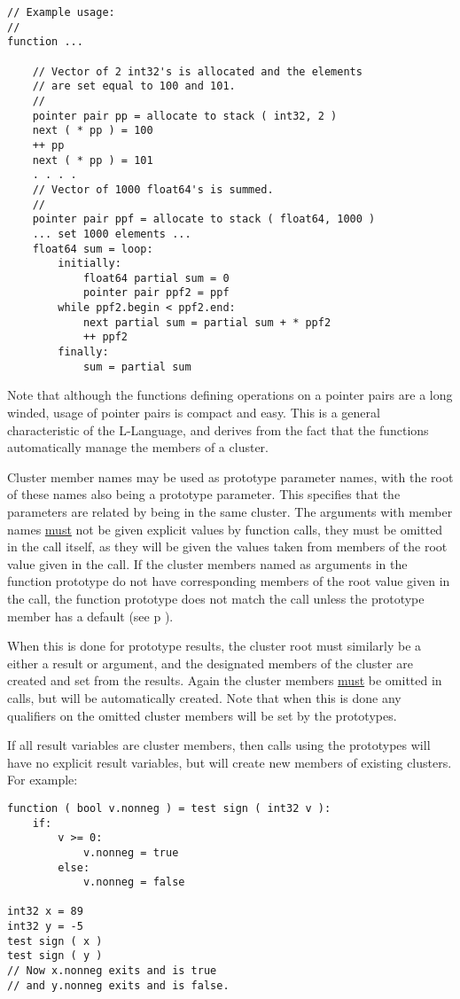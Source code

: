 \documentclass[12pt]{article}
\newcommand{\pagref}[1]{p\pageref{#1}}
\newenvironment{indpar}[1][0.3in]%
	{\begin{list}{}%
		     {\setlength{\itemsep}{0in}%
		      \setlength{\topsep}{0in}%
		      \setlength{\parsep}{1ex}%
		      \setlength{\labelwidth}{#1}%
		      \setlength{\leftmargin}{#1}%
		      \addtolength{\leftmargin}{\labelsep}}%
	 \item}%
	{\end{list}}
\begin{document}
\begin{indpar}
\begin{verbatim}
// Example usage:
//
function ...

    // Vector of 2 int32's is allocated and the elements
    // are set equal to 100 and 101.
    //
    pointer pair pp = allocate to stack ( int32, 2 )
    next ( * pp ) = 100
    ++ pp
    next ( * pp ) = 101
    . . . .
    // Vector of 1000 float64's is summed.
    //
    pointer pair ppf = allocate to stack ( float64, 1000 )
    ... set 1000 elements ...
    float64 sum = loop:
        initially:
            float64 partial sum = 0
            pointer pair ppf2 = ppf
        while ppf2.begin < ppf2.end:
            next partial sum = partial sum + * ppf2
            ++ ppf2
        finally:
            sum = partial sum
\end{verbatim}\end{indpar}\label{NEXT-CLUSTER-BASE-EXAMPLE}

Note that although the functions defining operations on a pointer pairs
are a long winded, usage of pointer pairs is compact and easy.
This is a general characteristic of the L-Language, and derives
from the fact that the functions automatically manage the members
of a cluster.

Cluster member names may be used as prototype parameter
names, with the root of these names also being a prototype
parameter.  This specifies that the parameters are related
by being in the same cluster.  The arguments with member names
\underline{must} not be given explicit values by function calls,
they must be omitted in the call itself, as they will be given
the values taken from members of the root value given in the call.
If the cluster members named as arguments
in the function prototype do not have corresponding members of the
root value given in the call,
the function prototype does not match the call unless the prototype
member has a default (see \pagref{DEFAULTS-TO} ).

When this is done for prototype results, the cluster root must similarly
be a either a result or argument, and the designated
members of the cluster are created and set from the results.
Again the cluster members \underline{must} be omitted in calls,
but will be automatically created.
Note that when this is done any qualifiers on the omitted cluster
members will be set by the prototypes.

If all result variables are cluster members, then calls
using the prototypes will have no explicit result variables,
but will create new members of existing clusters.  For example:
\begin{indpar}\begin{verbatim}
function ( bool v.nonneg ) = test sign ( int32 v ):
    if:
        v >= 0:
            v.nonneg = true
        else:
            v.nonneg = false

int32 x = 89
int32 y = -5
test sign ( x )
test sign ( y )
// Now x.nonneg exits and is true
// and y.nonneg exits and is false.
\end{verbatim}\end{indpar}
\end{document}
